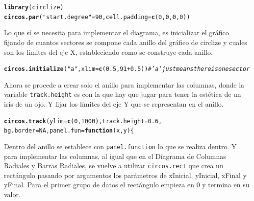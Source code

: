 \documentclass{article}\usepackage[]{graphicx}\usepackage[]{color}
\makeatletter
\newcommand{\hlnum}[1]{\textcolor[rgb]{0.686,0.059,0.569}{#1}}%
\newcommand{\hlstr}[1]{\textcolor[rgb]{0.192,0.494,0.8}{#1}}%
\newcommand{\hlcom}[1]{\textcolor[rgb]{0.678,0.584,0.686}{\textit{#1}}}%
\newcommand{\hlopt}[1]{\textcolor[rgb]{0,0,0}{#1}}%
\newcommand{\hlstd}[1]{\textcolor[rgb]{0.345,0.345,0.345}{#1}}%
\newcommand{\hlkwc}[1]{\textcolor[rgb]{0.333,0.667,0.333}{#1}}%
\newcommand{\hlkwd}[1]{\textcolor[rgb]{0.737,0.353,0.396}{\textbf{#1}}}%
\newenvironment{kframe}{%
 \def\at@end@of@kframe{}%
 \ifinner\ifhmode%
  \def\at@end@of@kframe{\end{minipage}}%
  \begin{minipage}{\columnwidth}%
 \fi\fi%
 \def\FrameCommand##1{\hskip\@totalleftmargin \hskip-\fboxsep
 \colorbox{shadecolor}{##1}\hskip-\fboxsep
     \hskip-\linewidth \hskip-\@totalleftmargin \hskip\columnwidth}%
 \MakeFramed {\advance\hsize-\width
   \@totalleftmargin\z@ \linewidth\hsize
   \@setminipage}}%
 {\par\unskip\endMakeFramed%
 \at@end@of@kframe}
\newenvironment{knitrout}{}{} %
\makeatother
\begin{document}
\begin{knitrout}
\color{fgcolor}\begin{kframe}
\begin{alltt}
\hlkwd{library}\hlstd{(circlize)}
\hlkwd{circos.par}\hlstd{(}\hlstr{"start.degree"} \hlstd{=} \hlnum{90}\hlstd{,} \hlkwc{cell.padding} \hlstd{=} \hlkwd{c}\hlstd{(}\hlnum{0}\hlstd{,} \hlnum{0}\hlstd{,} \hlnum{0}\hlstd{,} \hlnum{0}\hlstd{))}
\end{alltt}
\end{kframe}
\end{knitrout}
\clearpage
Lo que s\'i se necesita para implementar el diagrama, es inicializar el gr\'afico fijando de cuantos sectores se compone cada anillo del gr\'afico de circlize y cuales son los l\'imites del eje X, estableciendo como se construye cada anillo.
\begin{knitrout}
\color{fgcolor}\begin{kframe}
\begin{alltt}
\hlkwd{circos.initialize}\hlstd{(}\hlstr{"a"}\hlstd{,} \hlkwc{xlim} \hlstd{=} \hlkwd{c}\hlstd{(}\hlnum{0.5}\hlstd{,} \hlnum{91}\hlopt{+}\hlnum{0.5}\hlstd{))} \hlcom{# 'a` just means there is one sector}
\end{alltt}
\end{kframe}
\end{knitrout}
Ahora se procede a crear solo el anillo para implementar las columnas, donde la variable \texttt{track.height} es con la que hay que jugar para tener la est\'etica de un iris de un ojo. Y fijar los l\'imites del eje Y que se representan en el anillo.
\begin{knitrout}
\color{fgcolor}\begin{kframe}
\begin{alltt}
\hlkwd{circos.track}(ylim = \hlkwd{c}(0, 1000), track.height = 0.6, 
             bg.border = NA, panel.fun = \hlkwd{function}(x, y) \{
\end{alltt}
\end{kframe}
\end{knitrout}
Dentro del anillo se establece con \texttt{panel.function} lo que se realiza dentro.
Y para implementar las columnas, al igual que en el Diagrama de Columnas Radiales y Barras Radiales, se vuelve a utilizar \texttt{circos.rect} que crea un rect\'angulo pasando por argumentos los par\'ametros de xInicial, yInicial, xFinal y yFinal. Para el primer grupo de datos el rect\'angulo empieza en 0 y termina en su valor.
\end{document}

